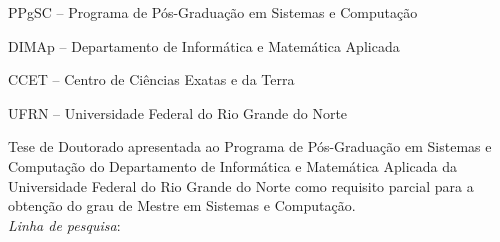 
\titulo{\Large{\Mtitulo}}
\autor{\Mautor}
\orientador[Orientador]{\par \Morientador}
\instituicao
{
	PPgSC -- Programa de Pós-Graduação em Sistemas e Computação\par 
	DIMAp -- Departamento de Informática e Matemática Aplicada\par
   CCET -- Centro de Ciências Exatas e da Terra\par
   UFRN -- Universidade Federal do Rio Grande do Norte
}
	
\comentario
{
	Tese de Doutorado apresentada ao Programa de Pós-Graduação em Sistemas e Computação do Departamento de Informática e Matemática Aplicada da Universidade Federal do Rio Grande do Norte como requisito parcial para a obtenção do grau de Mestre em Sistemas e Computação.\bigskip\\
   \textit{Linha de pesquisa}:\\\Mlinha
}
		
\data{\Mdata}
	
\folhaderosto